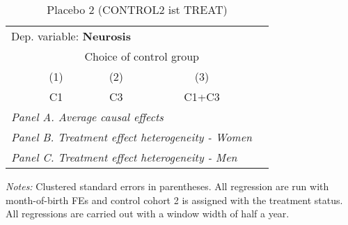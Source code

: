  \begin{table}[H] \centering \begin{threeparttable} \caption{Placebo 2 (CONTROL2 ist TREAT) } {\def\sym#1{\ifmmode^{#1}\else\(^{#1}\)\fi} \begin{tabular}{l*{4}{c}} \toprule \multicolumn{4}{l}{Dep. variable: \textbf{Neurosis}} \\ & \multicolumn{3}{c}{Choice of control group} \\ \cmidrule(lr){2-4}
            &\multicolumn{1}{c}{(1)}&\multicolumn{1}{c}{(2)}&\multicolumn{1}{c}{(3)}\\
            &\multicolumn{1}{c}{C1}&\multicolumn{1}{c}{C3}&\multicolumn{1}{c}{C1+C3}\\
\midrule
 \multicolumn{4}{l}{\emph{Panel A. Average causal effects}} \\      \midrule\multicolumn{4}{l}{\emph{Panel B. Treatment effect heterogeneity - Women}} \\      \midrule\multicolumn{4}{l}{\emph{Panel C. Treatment effect heterogeneity - Men}} \\      
\bottomrule \end{tabular} } \begin{tablenotes} \item \scriptsize \emph{Notes:} Clustered standard errors in parentheses. All regression are run with month-of-birth FEs and control cohort 2 is assigned with the treatment status. All regressions are carried out with a window width of half a year. \end{tablenotes} \end{threeparttable} \end{table} 
